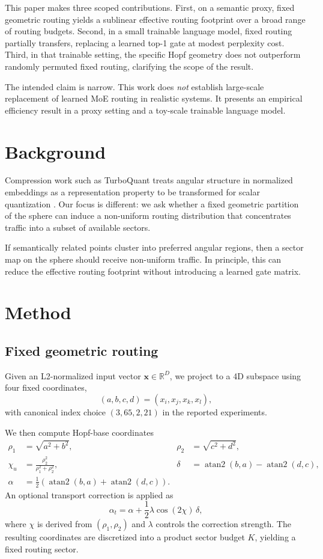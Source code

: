 \documentclass[10pt,twocolumn]{article}
\begin{document}
This paper makes three scoped contributions. First, on a semantic proxy, fixed geometric routing yields a sublinear effective routing footprint over a broad range of routing budgets. Second, in a small trainable language model, fixed routing partially transfers, replacing a learned top-1 gate at modest perplexity cost. Third, in that trainable setting, the specific Hopf geometry does not outperform randomly permuted fixed routing, clarifying the scope of the result.

The intended claim is narrow. This work does \emph{not} establish large-scale replacement of learned MoE routing in realistic systems. It presents an empirical efficiency result in a proxy setting and a toy-scale trainable language model.

\section{Background}
Compression work such as TurboQuant treats angular structure in normalized embeddings as a representation property to be transformed for scalar quantization \citep{turboquant2026}. Our focus is different: we ask whether a fixed geometric partition of the sphere can induce a non-uniform routing distribution that concentrates traffic into a subset of available sectors.

If semantically related points cluster into preferred angular regions, then a sector map on the sphere should receive non-uniform traffic. In principle, this can reduce the effective routing footprint without introducing a learned gate matrix.

\section{Method}
\subsection{Fixed geometric routing}
Given an L2-normalized input vector $\mathbf{x} \in \mathbb{R}^D$, we project to a 4D subspace using four fixed coordinates,
\[
(a,b,c,d) = (x_i,x_j,x_k,x_l),
\]
with canonical index choice $(3,65,2,21)$ in the reported experiments.

We then compute Hopf-base coordinates
\begin{align}
\rho_1 &= \sqrt{a^2+b^2}, & \rho_2 &= \sqrt{c^2+d^2}, \\
\chi_u &= \frac{\rho_2^2}{\rho_1^2+\rho_2^2},
& \delta &= \operatorname{atan2}(b,a)-\operatorname{atan2}(d,c), \\
\alpha &= \tfrac{1}{2}\left(\operatorname{atan2}(b,a)+\operatorname{atan2}(d,c)\right).
\end{align}
An optional transport correction is applied as
\[
\alpha_t = \alpha + \frac{1}{2}\lambda \cos(2\chi)\,\delta,
\]
where $\chi$ is derived from $(\rho_1,\rho_2)$ and $\lambda$ controls the correction strength. The resulting coordinates are discretized into a product sector budget $K$, yielding a fixed routing sector.
\end{document}
